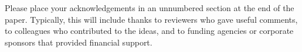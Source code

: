 \documentclass[11pt,letterpaper]{article}
\begin{document}
\begin{acknowledgements} 
\noindent
Please place your acknowledgements in an unnumbered section at the
end of the paper. Typically, this will include thanks to reviewers
who gave useful comments, to colleagues who contributed to the ideas, 
and to funding agencies or corporate sponsors that provided financial 
support.
\end{acknowledgements} 

\vspace{-0.25in}

{\parindent -10pt\leftskip 10pt\noindent



}

\end{document}
